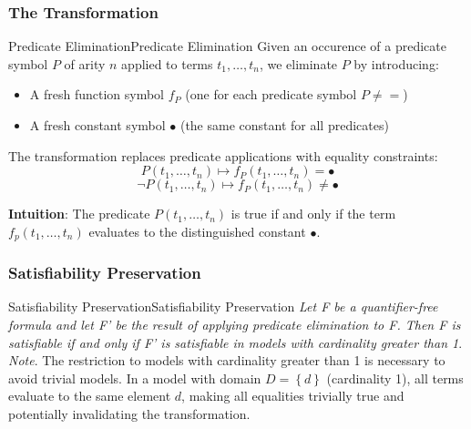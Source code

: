 \documentclass[a4paper]{article}
\theoremstyle{definition}
\begin{document}
\subsubsection{The Transformation}
\begin{definition}{Predicate Elimination}{Predicate Elimination}
Given an occurence of a predicate symbol \( P \) of arity \( n \) applied to terms \( t_1, \ldots, t_n \), we eliminate \( P \) by introducing:
\begin{itemize}
	\item A fresh function symbol \( f_P \) (one for each predicate symbol \( P \neq = \))
	\item A fresh constant symbol \( \bullet \) (the same constant for all predicates)
\end{itemize}
The transformation replaces predicate applications with equality constraints:
\[
  P(t_1, \ldots, t_n) \mapsto f_P(t_1, \ldots, t_n) = \bullet 
\]
\[
  \lnot P(t_1, \ldots, t_n) \mapsto f_P(t_1, \ldots, t_n) \neq \bullet
\]
\end{definition}
\textbf{Intuition}: The predicate \( P(t_1, \ldots, t_n) \) is true if and only if the term \( f_p(t_1, \ldots, t_n) \) evaluates to 
the distinguished constant \( \bullet \).
\subsubsection{Satisfiability Preservation}
\begin{theorem}{Satisfiability Preservation}{Satisfiability Preservation} 
\textit{Let F be a quantifier-free formula and let F' be the result of applying predicate elimination to F. 
Then F is satisfiable if and only if F' is satisfiable in models with cardinality greater than 1}.
\vspace{1em}
\noindent
\newline
\textit{Note}. The restriction to models with cardinality greater than 1 is necessary to avoid trivial models.
In a model with domain \( D = \left\{d\right\} \) (cardinality 1), all terms evaluate to the same element \( d \), 
making all equalities trivially true and potentially invalidating the transformation.
\end{theorem}
\end{document}
